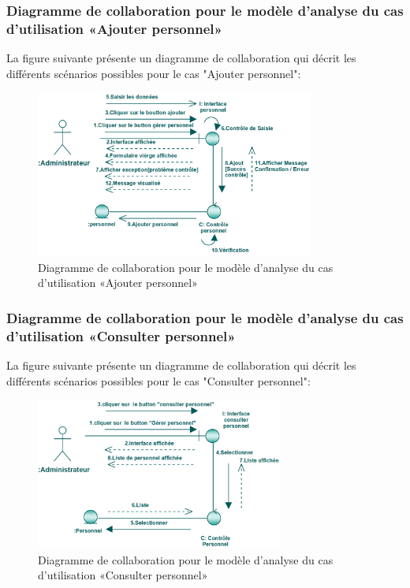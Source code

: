 \documentclass[12 pt]{report}
\begin{document}
\subsubsection{Diagramme de collaboration pour le modèle d’analyse du cas d'utilisation                                       «Ajouter personnel»}
La figure suivante présente un diagramme de collaboration qui décrit les différents
scénarios possibles pour le cas "Ajouter personnel":\begin{figure}[h]
 \begin{center}
\includegraphics[width= 12 cm ,height=  5.5cm]{collaajoutper.PNG}
\caption{Diagramme de collaboration pour le modèle d’analyse du cas d'utilisation                                       «Ajouter personnel»}

\end{center}
\end{figure}
\subsubsection{Diagramme de collaboration pour le modèle d’analyse du cas d'utilisation                                       «Consulter personnel»}
La figure suivante présente un diagramme de collaboration qui décrit les différents
scénarios possibles pour le cas "Consulter personnel":
\begin{figure}[h]
 \begin{center}
\includegraphics[width= 14 cm ,height=  5cm]{collaconsper.PNG}
\caption{Diagramme de collaboration pour le modèle d’analyse du cas d'utilisation                                       «Consulter personnel»}

\end{center}
\end{figure}
\end{document}
